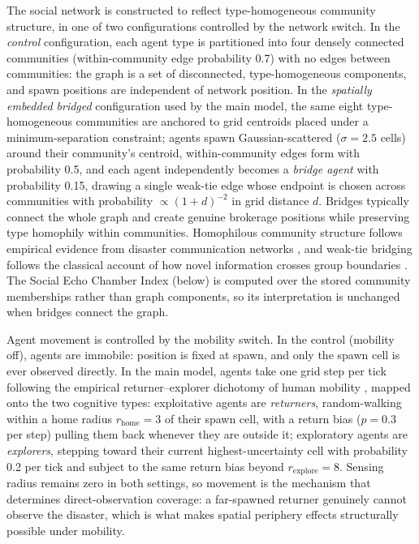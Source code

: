 \documentclass[pdflatex,sn-nature]{sn-jnl}
\begin{document}
The social network is constructed to reflect type-homogeneous community structure, in one of two configurations controlled by the network switch. In the \emph{control} configuration, each agent type is partitioned into four densely connected communities (within-community edge probability 0.7) with no edges between communities: the graph is a set of disconnected, type-homogeneous components, and spawn positions are independent of network position. In the \emph{spatially embedded bridged} configuration used by the main model, the same eight type-homogeneous communities are anchored to grid centroids placed under a minimum-separation constraint; agents spawn Gaussian-scattered ($\sigma = 2.5$ cells) around their community's centroid, within-community edges form with probability 0.5, and each agent independently becomes a \emph{bridge agent} with probability 0.15, drawing a single weak-tie edge whose endpoint is chosen across communities with probability $\propto (1 + d)^{-2}$ in grid distance $d$. Bridges typically connect the whole graph and create genuine brokerage positions while preserving type homophily within communities. Homophilous community structure follows empirical evidence from disaster communication networks \citep{bruns2012qldfloods,sutton2008backchannels},
and weak-tie bridging follows the classical account of how novel information crosses group boundaries \citep{granovetter1973strength}. The Social Echo Chamber Index (below) is computed over the stored community memberships rather than graph components, so its interpretation is unchanged when bridges connect the graph.

Agent movement is controlled by the mobility switch. In the control (mobility off), agents are immobile: position is fixed at spawn, and only the spawn cell is ever observed directly. In the main model, agents take one grid step per tick following the empirical returner--explorer dichotomy of human mobility \citep{pappalardo2015returners}, mapped onto the two cognitive types: exploitative agents are \emph{returners}, random-walking within a home radius $r_{\text{home}} = 3$ of their spawn cell, with a return bias ($p = 0.3$ per step) pulling them back whenever they are outside it; exploratory agents are \emph{explorers}, stepping toward their current highest-uncertainty cell with probability 0.2 per tick and subject to the same return bias beyond $r_{\text{explore}} = 8$. Sensing radius remains zero in both settings, so movement is the mechanism that determines direct-observation coverage: a far-spawned returner genuinely cannot observe the disaster, which is what makes spatial periphery effects structurally possible under mobility.
\end{document}
